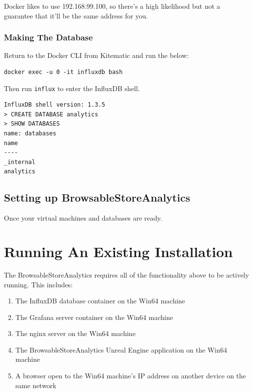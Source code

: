 Docker likes to use 192.168.99.100, so there's a high likelihood but not
a guarantee that it'll be the same address for you.

\subsubsection{Making The Database}\label{making-the-database}

Return to the Docker CLI from Kitematic and run the below:

\begin{verbatim}
docker exec -u 0 -it influxdb bash
\end{verbatim}

Then run \texttt{influx} to enter the InfluxDB shell.

\begin{verbatim}
InfluxDB shell version: 1.3.5
> CREATE DATABASE analytics
> SHOW DATABASES
name: databases
name
----
_internal
analytics
\end{verbatim}

\subsection{Setting up
BrowsableStoreAnalytics}\label{setting-up-browsablestoreanalytics}

Once your virtual machines and databases are ready.

\section{Running An Existing
Installation}\label{running-an-existing-installation}

The BrowsableStoreAnalytics requires all of the functionality above to
be actively running. This includes:

\begin{enumerate}
\def\labelenumi{\arabic{enumi}.}
\tightlist
\item
  The InfluxDB database container on the Win64 machine
\item
  The Grafana server container on the Win64 machine
\item
  The nginx server on the Win64 machine
\item
  The BrowsableStoreAnalytics Unreal Engine application on the Win64
  machine
\item
  A browser open to the Win64 machine's IP address on another device on
  the same network
\end{enumerate}

